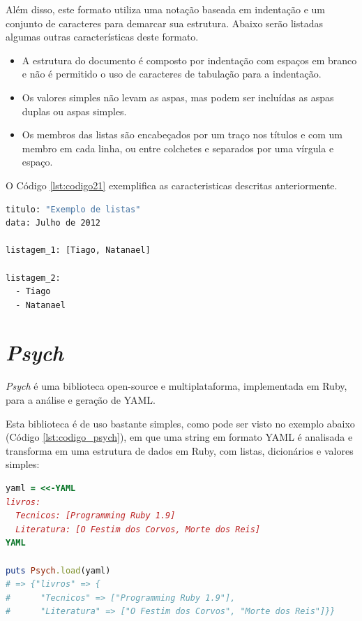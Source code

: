 Além disso, este formato utiliza uma notação baseada em indentação e um conjunto de caracteres para demarcar sua estrutura. Abaixo serão listadas algumas outras características deste formato.

\begin{itemize}
\item A estrutura do documento é composto por indentação com espaços em branco e não é permitido o uso de caracteres de tabulação para a indentação.

\item Os valores simples não levam as aspas, mas podem ser incluídas as aspas duplas ou aspas simples.

\item Os membros das listas são encabeçados por um traço nos títulos e com um membro em cada linha, ou entre colchetes e separados por uma vírgula e espaço.
\end{itemize}

O Código \ref{lst:codigo21} exemplifica as caracteristicas descritas anteriormente.

{\singlespace
\begin{lstlisting}[caption=Estrutura do código \textit{YAML},language=bash,label={lst:codigo21}]
titulo: "Exemplo de listas"
data: Julho de 2012

listagem_1: [Tiago, Natanael]

listagem_2:
  - Tiago
  - Natanael
\end{lstlisting}
}

\section{\textit{Psych}}

\textit{Psych} \cite{PSYCH} é uma biblioteca open-source e multiplataforma, implementada em Ruby, para a análise e geração de YAML.

Esta biblioteca é de uso bastante simples, como pode ser visto no exemplo abaixo (Código \ref{lst:codigo_psych}), em que uma string em formato YAML é analisada e transforma em uma estrutura de dados em Ruby, com listas, dicionários e valores simples:

{\singlespace
\begin{lstlisting}[caption=Biblioteca \textit{Psych}, language=Ruby,label={lst:codigo_psych}]
yaml = <<-YAML
livros:
  Tecnicos: [Programming Ruby 1.9]
  Literatura: [O Festim dos Corvos, Morte dos Reis]
YAML

puts Psych.load(yaml)
# => {"livros" => {
#      "Tecnicos" => ["Programming Ruby 1.9"],
#      "Literatura" => ["O Festim dos Corvos", "Morte dos Reis"]}}
\end{lstlisting}
}

